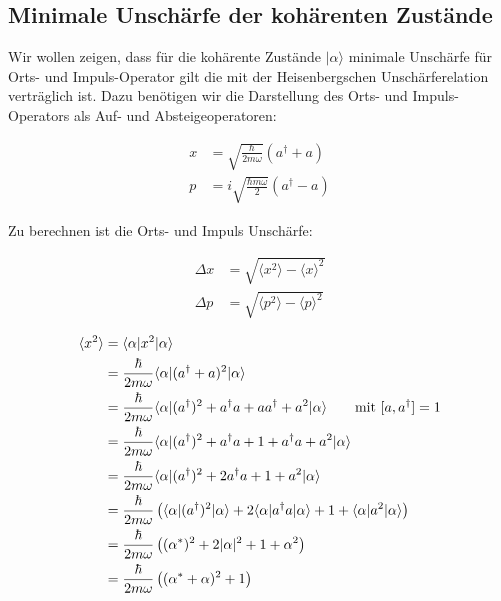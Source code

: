 \subsection*{Minimale Unschärfe der kohärenten Zustände}

Wir wollen zeigen, dass für die kohärente Zustände \(|\alpha\rangle \) minimale Unschärfe für Orts- und Impuls-Operator gilt die mit der Heisenbergschen Unschärferelation verträglich ist. Dazu benötigen wir die Darstellung des  Orts- und Impuls-Operators als Auf- und Absteigeoperatoren:

\begin{align}
  x &= \sqrt{ \frac{\hbar}{2m\omega}} (a^\dagger+a) \label{eq:11}\\
  p &= i\sqrt{ \frac{\hbar m\omega}{2}} (a^\dagger-a) \label{eq:12}
\end{align}

Zu berechnen ist die Orts- und Impuls Unschärfe:

\begin{align}
  \Delta x &= \sqrt{ \langle x^2\rangle -\langle x\rangle^2 }\label{eq:13}\\
   \Delta p &= \sqrt{ \langle p^2\rangle -\langle p\rangle^2 }\label{eq:14}
\end{align}


\begin{align}
  \label{eq:15}
  \langle x^2\rangle &= \langle \alpha|x^2|\alpha\rangle \notag\\
  &= \frac{\hbar}{2m\omega}\langle \alpha|(a^\dagger + a)^2|\alpha\rangle \notag\\
  &= \frac{\hbar}{2m\omega}\langle \alpha|(a^\dagger)^2 + a^\dagger a+aa^\dagger +a^2|\alpha\rangle \qquad \text{mit } [a,a^\dagger] = 1 \notag\\
   &= \frac{\hbar}{2m\omega}\langle \alpha|(a^\dagger)^2 + a^\dagger a+1+a^\dagger a +a^2|\alpha\rangle \notag\\
   &= \frac{\hbar}{2m\omega}\langle \alpha|(a^\dagger)^2 + 2 a^\dagger a+1 +a^2|\alpha\rangle\notag\\
   &= \frac{\hbar}{2m\omega}\left(\langle \alpha|(a^\dagger)^2|\alpha\rangle + 2\langle \alpha| a^\dagger a|\alpha\rangle+ 1 +\langle \alpha| a^2|\alpha\rangle\right)\notag \\
   &= \frac{\hbar}{2m\omega}\left((\alpha^*)^2 + 2| \alpha|^2 + 1 + \alpha^2\right) \notag\\
   &= \frac{\hbar}{2m\omega}\left((\alpha^*+\alpha)^2 + 1\right)
\end{align}

